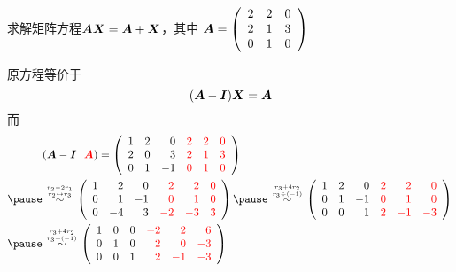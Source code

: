 \begin{frame}

  \begin{li}
    求解矩阵方程$\boldsymbol{A}\boldsymbol{X}=\boldsymbol{A}+\boldsymbol{X}$，其中
    $
    \boldsymbol{A} = \left(
      \begin{array}{ccc}
        2&2&0\\
        2&1&3\\
        0&1&0
      \end{array}
    \right)
    $
  \end{li}
\end{frame}


\begin{frame}
  \begin{jie}
    原方程等价于
    $$
    (\boldsymbol{A}-\boldsymbol{I})\boldsymbol{X}=\boldsymbol{A}
    $$
    \pause
    而
    $$
    \begin{aligned}
      &  (\MA-\MI ~~\red{\MA}) =\left(
        \begin{array}{rrrrrr}
          1&2& 0&\red{2}&\red{2}&\red{0}\\
          2&0& 3&\red{2}&\red{1}&\red{3}\\
          0&1&-1&\red{0}&\red{1}&\red{0}
        \end{array}
      \right)\\\pause
      &\overset{r_2-2r_1\atop r_2\leftrightarrow r_3}{\sim}
      \left(
        \begin{array}{rrrrrr}
          1& 2& 0&\red{ 2}&\red{ 2}&\red{0}\\
          0& 1&-1&\red{ 0}&\red{ 1}&\red{0}\\
          0&-4& 3&\red{-2}&\red{-3}&\red{3}
        \end{array}
      \right)     \pause
      \overset{r_3+4r_2\atop r_3\div(-1)}{\sim}
      \left(
        \begin{array}{rrrrrr}
          1&2& 0&\red{2}&\red{ 2}&\red{ 0}\\
          0&1&-1&\red{0}&\red{ 1}&\red{ 0}\\
          0&0& 1&\red{2}&\red{-1}&\red{-3}
        \end{array}
      \right) \\ \pause
      &  
      \overset{r_3+4r_2\atop r_3\div(-1)}{\sim}
      \left(
        \begin{array}{rrrrrr}
          1&0&0&\red{-2}&\red{2}&\red{6}\\
          0&1&0&\red{2}&\red{0}&\red{-3}\\
          0&0&1&\red{2}&\red{-1}&\red{-3}
        \end{array}
      \right)
    \end{aligned}
    $$
  \end{jie}
\end{frame}


